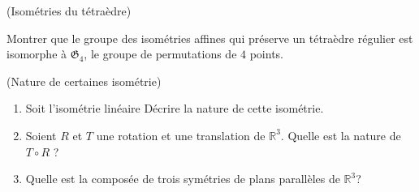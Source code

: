 \documentclass[a4paper,12pt,reqno]{amsart}
\begin{document}
\begin{exo} (Isométries du tétraèdre)

    Montrer que le groupe des isométries affines qui préserve un tétraèdre régulier est isomorphe à $\mathfrak{G}_{4}$, le groupe de permutations de $4$ points.
\end{exo}

\begin{exo} (Nature de certaines isométrie)
  \begin{enumerate}
    \item Soit l'isométrie linéaire%
      \scalebox{.7}{
        $
          \begin{pmatrix}
            0 & 0 & 1 \\
            1 & 0 & 0 \\
            0 & 1 & 0
          \end{pmatrix}
        $.
      }
      Décrire la nature de cette isométrie.
    \item Soient $R$ et $T$ une rotation et une translation de $\mathbb{R}^{3}$. Quelle est la nature de $T \circ R$ ?
    \item Quelle est la composée de trois symétries de plans parallèles de $\mathbb{R}^{3}$?
  \end{enumerate}
\end{exo}
\end{document}
